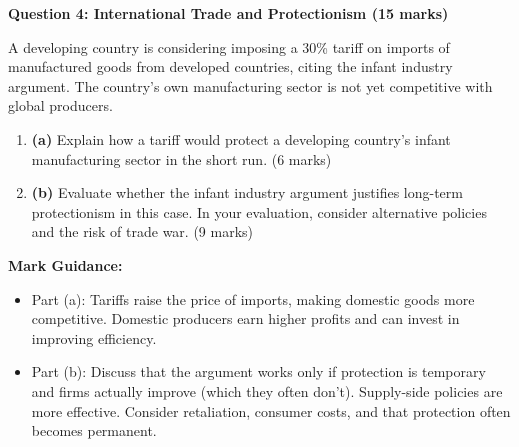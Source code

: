\documentclass[11pt, a4paper, twoside]{book}
\begin{document}
\begin{exampractice}

\textbf{Question 4: International Trade and Protectionism (15 marks)}

A developing country is considering imposing a 30\% tariff on imports of manufactured goods from developed countries, citing the infant industry argument. The country's own manufacturing sector is not yet competitive with global producers.

\begin{enumerate}
  \item \textbf{(a)} Explain how a tariff would protect a developing country's infant manufacturing sector in the short run. (6 marks)

  \item \textbf{(b)} Evaluate whether the infant industry argument justifies long-term protectionism in this case. In your evaluation, consider alternative policies and the risk of trade war. (9 marks)
\end{enumerate}

\textbf{Mark Guidance:}
\begin{itemize}
  \item Part (a): Tariffs raise the price of imports, making domestic goods more competitive. Domestic producers earn higher profits and can invest in improving efficiency.
  \item Part (b): Discuss that the argument works only if protection is temporary and firms actually improve (which they often don't). Supply-side policies are more effective. Consider retaliation, consumer costs, and that protection often becomes permanent.
\end{itemize}

\end{exampractice}
\end{document}
